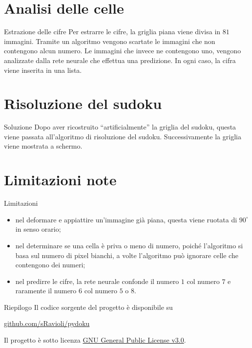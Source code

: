 \documentclass[10pt]{beamer}
\begin{document}
\section{Analisi delle celle}

\begin{frame}[fragile]{Estrazione delle cifre}
    Per estrarre le cifre, la griglia piana viene divisa in \(81\) immagini.
    Tramite un algoritmo vengono scartate le immagini che non contengono alcun numero. Le immagini che invece ne contengono uno, vengono analizzate dalla rete neurale che effettua una predizione. In ogni caso, la cifra viene inserita in una lista.
\end{frame}

\section{Risoluzione del sudoku}

\begin{frame}[fragile]{Soluzione}
    Dopo aver ricostruito ``artificialmente'' la griglia del sudoku, questa
    viene passata all'algoritmo di risoluzione del sudoku.
    Successivamente la griglia viene mostrata a schermo.
\end{frame}

\section{Limitazioni note}

\begin{frame}[fragile]{Limitazioni}
    \begin{itemize}
        \item nel deformare e appiattire un'immagine già piana, questa viene ruotata di \(90^\circ\) in senso orario;
        \item nel determinare se una cella è priva o meno di numero, poiché l'algoritmo si basa sul numero di pixel bianchi, a volte l'algoritmo può ignorare celle che contengono dei numeri;
        \item nel predirre le cifre, la rete neurale confonde il numero \(1\) col numero \(7\) e raramente il numero \(6\) col numero \(5\) o \(8\).
    \end{itemize}
\end{frame}

\begin{frame}{Riepilogo}
    Il codice sorgente del progetto è disponibile su

    \begin{center}
        \href{https://www.github.com/sRavioli/pydoku}{github.com/sRavioli/pydoku}
    \end{center}

    Il progetto è sotto licenza \href{https://www.gnu.org/licenses/gpl-3.0.html}{GNU General Public License v3.0}.
\end{frame}
\end{document}
